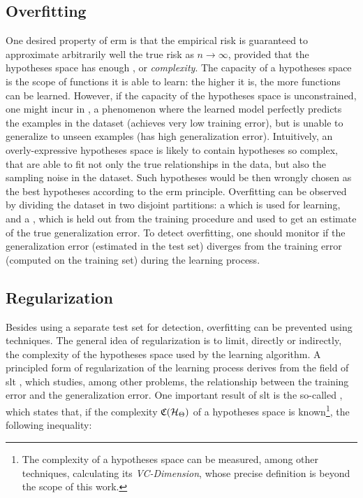 \subsection{Overfitting}
One desired property of \gls{erm} is that the empirical risk is guaranteed to approximate arbitrarily well the true risk as $n \to \infty$, provided that the hypotheses space has enough , or \emph{complexity}. The capacity of a hypotheses space is the scope of functions it is able to learn: the higher it is, the more  functions can be learned. However, if the capacity of the hypotheses space is unconstrained, one might incur in , a phenomenon where the learned model perfectly predicts the examples in the dataset (achieves very low training error), but is unable to generalize to unseen examples (has high generalization error). Intuitively, an overly-expressive hypotheses space is likely to contain hypotheses so complex, that are able to fit not only the true relationships in the data, but also the sampling noise in the dataset. Such hypotheses would be then wrongly chosen as the best hypotheses according to the \gls{erm} principle. Overfitting can be observed by dividing the dataset in two disjoint partitions: a  which is used for learning, and a , which is held out from the training procedure and used to get an estimate of the true generalization error. To detect overfitting, one should monitor if the generalization error (estimated in the test set) diverges from the training error (computed on the training set) during the learning process.

\subsection{Regularization}
Besides using a separate test set for detection, overfitting can be prevented \apriori using  techniques. The general idea of regularization is to limit, directly or indirectly, the complexity of the hypotheses space used by the learning algorithm. A principled form of regularization of the learning process derives from the field of \gls{slt} \citep{vapnik2000slt}, which studies, among other problems, the relationship between the training error and the generalization error.  One important result of \gls{slt} is the so-called , which states that, if the complexity $\Complexity(\HSpace)$ of a hypotheses space is known\footnote{The complexity of a hypotheses space can be measured, among other techniques, calculating its \emph{VC-Dimension}, whose precise definition is beyond the scope of this work.}, the following inequality:


